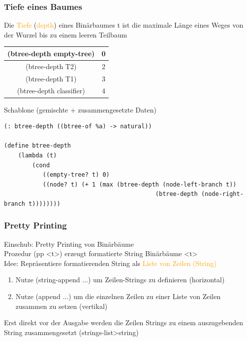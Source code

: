 \documentclass[paper=a4, fontsize=11pt]{scrartcl}
\numberwithin{equation}{section}
\numberwithin{figure}{section}
\numberwithin{table}{section}
\begin{document}
\begin{lstlistig}
\subsubsection{Tiefe eines Baumes}
Die \textcolor{orange}{Tiefe} (\textcolor{orange}{depth}) eines Binärbaumes t ist die maximale Länge eines Weges von der Wurzel bis zu einem leeren Teilbaum \\
\begin{tabular}{|c|c|}
\hline
(btree-depth empty-tree) & 0 \\\hline
(btree-depth T2) & 2 \\\hline
(btree-depth T1) & 3 \\\hline
(btree-depth classifier) & 4 \\\hline
\end{tabular}

Schablone (gemischte + zusammengesetzte Daten) \\

\begin{lstlisting}
(: btree-depth ((btree-of %a) -> natural))

(define btree-depth
    (lambda (t)
        (cond
           ((empty-tree? t) 0)
           ((node? t) (+ 1 (max (btree-depth (node-left-branch t))
                                           (btree-depth (node-right-branch t))))))))
\end{lstlisting}

\subsubsection{Pretty Printing}
Einschub: Pretty Printing von Binärbäume \\
Prozedur (pp <t>) erzeugt formatierte String Binärbäume <t> \\


Idee: Repräsentiere formatierenden String als \textcolor{orange}{Liste von Zeilen (String)} \\
\begin{enumerate}
\item Nutze (string-append ...) um Zeilen-Strings zu definieren (horizontal)
\item Nutze (append ...) um die einzelnen Zeilen zu einer Liste von Zeilen zusammen zu setzen (vertikal)
\end{enumerate}
Erst direkt vor der Ausgabe werden die Zeilen Strings zu einem auszugebenden String zusammengesetzt (strings-list>string)


\end{lstlistig}
\end{document}
